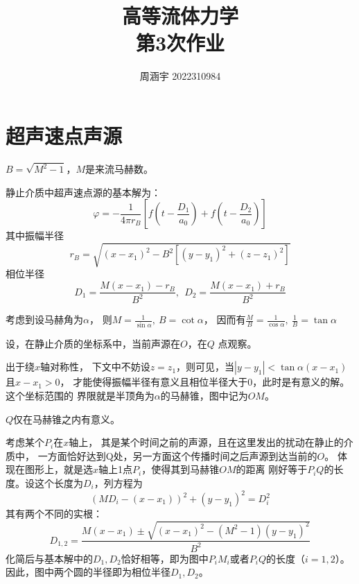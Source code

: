 \documentclass[UTF8,zihao=5]{ctexart} %
\title{{\bfseries\rmfamily\Huge{高等流体力学\hspace{1em}\\第3次作业}}}
\author{周涵宇 2022310984}
\date{}
\newcommand*{\pd}[2]{\frac{\partial #1}{\partial #2}}
\begin{document}
\maketitle
\thispagestyle{fancy}



\section{超声速点声源}


$B=\sqrt{M^2-1}$，$M$是来流马赫数。

静止介质中超声速点源的基本解为：
$$
    \varphi = -\frac{1}{4\pi r_B}\left[
        f\left(t-\frac{D_1}{a_0}\right)
        +
        f\left(t-\frac{D_2}{a_0}\right)
        \right]
$$
其中振幅半径
$$
    r_B=\sqrt{
        (x-x_1)^2
        -B^2\left[
            (y-y_1)^2
            +(z-z_1)^2
            \right]
    }
$$
相位半径
$$
    D_1=\frac{M(x-x_1)-r_B}{B^2},\ \
    D_2=\frac{M(x-x_1)+r_B}{B^2}
$$


考虑到设马赫角为$\alpha$，
则$M=\frac{1}{\sin{\alpha}},\ B=\cot{\alpha}$，
因而有$\frac{M}{B}=\frac{1}{\cos{\alpha}},\ \frac{1}{B}=\tan{\alpha}$



设，在静止介质的坐标系中，当前声源在$O$，在$Q$
点观察。

出于绕$x$轴对称性，
下文中不妨设$z=z_1$，则可见，当$|y-y_1|<\tan{\alpha}(x-x_1)$且$x-x_1>0$，
才能使得振幅半径有意义且相位半径大于0，此时是有意义的解。这个坐标范围的
界限就是半顶角为$\alpha$的马赫锥，图中记为$OM$。

$Q$仅在马赫锥之内有意义。

考虑某个$P_i$在$x$轴上，
其是某个时间之前的声源，且在这里发出的扰动在静止的介质中，
一方面恰好达到Q处，另一方面这个传播时间之后声源到达当前的$O$。
体现在图形上，就是选$x$轴上1点$P_i$，使得其到马赫锥$OM$的距离
刚好等于$P_iQ$的长度。设这个长度为$D_i$，列方程为
$$
    (MD_i-(x-x_1))^2+(y-y_1)^2=D_i^2
$$
其有两个不同的实根：
$$
    D_{1,2}=\frac{M(x-x_1)\pm\sqrt{(x-x_1)^2-(M^2-1)(y-y_1)^2}}{B^2}
$$
化简后与基本解中的$D_1,D_2$恰好相等，即为图中$P_iM_i$或者$P_iQ$的长度（$i=1,2$）。
因此，图中两个圆的半径即为相位半径$D_1,D_2$。
\end{document}
